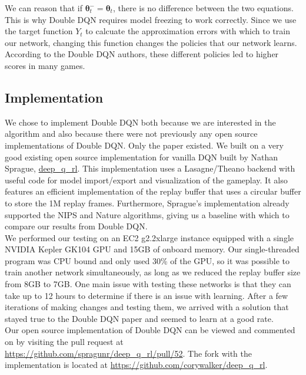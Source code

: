 \documentclass{article}
\begin{document}
  We can reason that if $\boldsymbol{\theta}_t^- = \boldsymbol{\theta}_t$, there is no difference between the two equations. This is why Double DQN requires model freezing to work correctly. Since we use the target function $Y_t$ to calcuate the approximation errors with which to train our network, changing this function changes the policies that our network learns. According to the Double DQN authors, these different policies led to higher scores in many games.

\subsection{Implementation}
  We chose to implement Double DQN both because we are interested in the algorithm and also because there were not previously any open source implementations of Double DQN. Only the paper existed. We built on a very good existing open source implementation for vanilla DQN built by Nathan Sprague, \href{https://github.com/spragunr/deep_q_rl}{deep\_q\_rl}. This implementation uses a Lasagne/Theano backend with useful code for model import/export and visualization of the gameplay. It also features an efficient implementation of the replay buffer that uses a circular buffer to store the 1M replay frames. Furthermore, Sprague's implementation already supported the NIPS and Nature algorithms, giving us a baseline with which to compare our results from Double DQN. \\

We performed our testing on an EC2 g2.2xlarge instance equipped with a single NVIDIA Kepler GK104 GPU and 15GB of onboard memory. Our single-threaded program was CPU bound and only used 30\% of the GPU, so it was possible to train another network simultaneously, as long as we reduced the replay buffer size from 8GB to 7GB. One main issue with testing these networks is that they can take up to 12 hours to determine if there is an issue with learning. After a few iterations of making changes and testing them, we arrived with a solution that stayed true to the Double DQN paper and seemed to learn at a good rate. \\

Our open source implementation of Double DQN can be viewed and commented on by visiting the pull request at \href{https://github.com/spragunr/deep_q_rl/pull/52}{https://github.com/spragunr/deep\_q\_rl/pull/52}. The fork with the implementation is located at \href{https://github.com/corywalker/deep_q_rl}{https://github.com/corywalker/deep\_q\_rl}.
\end{document}
